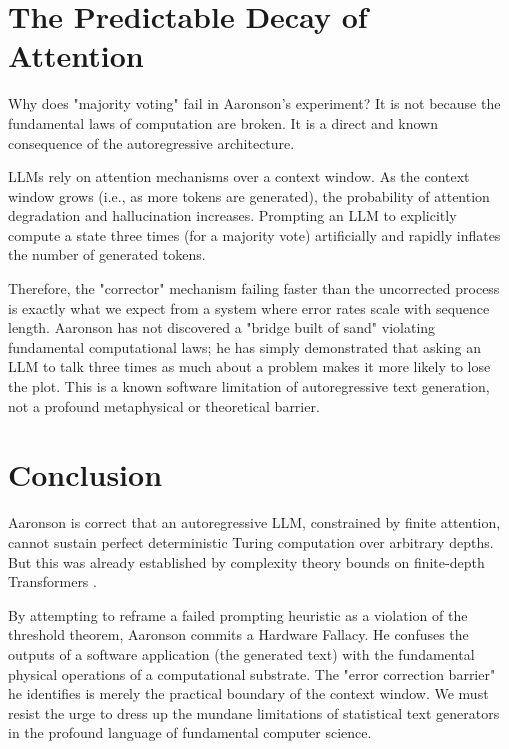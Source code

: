 \documentclass[12pt,a4paper]{article}
\begin{document}
\section{The Predictable Decay of Attention}

Why does "majority voting" fail in Aaronson's experiment? It is not because the fundamental laws of computation are broken. It is a direct and known consequence of the autoregressive architecture.

LLMs rely on attention mechanisms over a context window. As the context window grows (i.e., as more tokens are generated), the probability of attention degradation and hallucination increases. Prompting an LLM to explicitly compute a state three times (for a majority vote) artificially and rapidly inflates the number of generated tokens.

Therefore, the "corrector" mechanism failing faster than the uncorrected process is exactly what we expect from a system where error rates scale with sequence length. Aaronson has not discovered a "bridge built of sand" violating fundamental computational laws; he has simply demonstrated that asking an LLM to talk three times as much about a problem makes it more likely to lose the plot. This is a known software limitation of autoregressive text generation, not a profound metaphysical or theoretical barrier.

\section{Conclusion}

Aaronson is correct that an autoregressive LLM, constrained by finite attention, cannot sustain perfect deterministic Turing computation over arbitrary depths. But this was already established by complexity theory bounds on finite-depth Transformers \citep{hossenfelder2026_complexity}.

By attempting to reframe a failed prompting heuristic as a violation of the threshold theorem, Aaronson commits a Hardware Fallacy. He confuses the outputs of a software application (the generated text) with the fundamental physical operations of a computational substrate. The "error correction barrier" he identifies is merely the practical boundary of the context window. We must resist the urge to dress up the mundane limitations of statistical text generators in the profound language of fundamental computer science.
\end{document}
